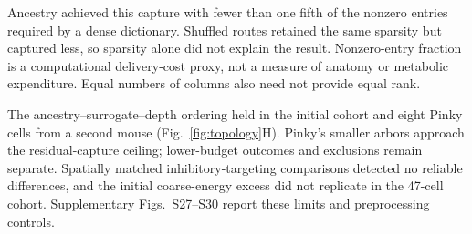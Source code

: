 \documentclass[11pt]{article}
\begin{document}
Ancestry achieved this capture with fewer than one fifth of the nonzero entries required by a dense dictionary. Shuffled routes retained the same sparsity but captured less, so sparsity alone did not explain the result. Nonzero-entry fraction is a computational delivery-cost proxy, not a measure of anatomy or metabolic expenditure. Equal numbers of columns also need not provide equal rank.

The ancestry--surrogate--depth ordering held in the initial cohort and eight Pinky cells from a second mouse (Fig.~\ref{fig:topology}H). Pinky's smaller arbors approach the residual-capture ceiling; lower-budget outcomes and exclusions remain separate. Spatially matched inhibitory-targeting comparisons detected no reliable differences, and the initial coarse-energy excess did not replicate in the 47-cell cohort. Supplementary Figs.~S27--S30 report these limits and preprocessing controls.
\end{document}
